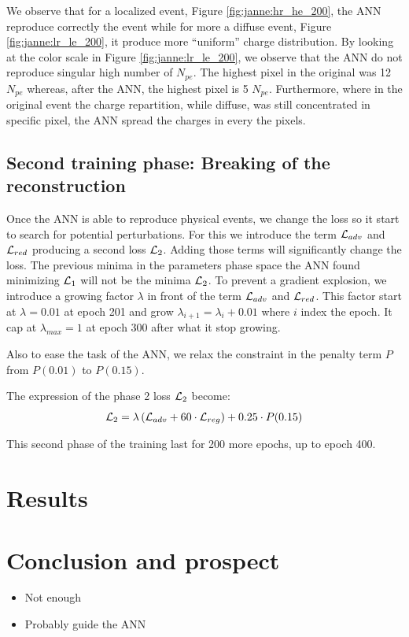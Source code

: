 \documentclass[../main.tex]{subfiles}
\begin{document}
We observe that for a localized event, Figure \ref{fig:janne:hr_he_200}, the ANN reproduce correctly the event while for more a diffuse event, Figure \ref{fig:janne:lr_le_200}, it produce more ``uniform'' charge distribution. By looking at the color scale in Figure \ref{fig:janne:lr_le_200}, we observe that the ANN do not reproduce singular high number of $N_{pe}$. The highest pixel in the original was 12 $N_{pe}$ whereas, after the ANN, the highest pixel is 5 $N_{pe}$. Furthermore, where in the original event the charge repartition, while diffuse, was still concentrated in specific pixel, the ANN spread the charges in every the pixels.

\subsection{Second training phase: Breaking of the reconstruction}
\label{sec:janne:results:break}

Once the ANN is able to reproduce physical events, we change the loss so it start to search for potential perturbations. For this we introduce the term ${\cal L}_{adv}$ and ${\cal L}_{red}$ producing a second loss ${\cal L}_2$. Adding those terms will significantly change the loss. The previous minima in the parameters phase space the ANN found minimizing ${\cal L}_1$ will not be the minima ${\cal L}_2$. To prevent a gradient explosion, we introduce a growing factor $\lambda$ in front of the term ${\cal L}_{adv}$ and ${\cal L}_{red}$. This factor start at $\lambda  = 0.01$ at epoch 201 and grow $\lambda_{i+1} = \lambda_{i} + 0.01$ where $i$ index the epoch. It cap at $\lambda_{max} = 1$ at epoch 300 after what it stop growing.

Also to ease the task of the ANN, we relax the constraint in the penalty term $P$ from $P(0.01)$ to $P(0.15)$.

The expression of the phase 2 loss ${\cal L}_2$ become:
\begin{equation}
  {\cal L}_2 = \lambda \left( {\cal L}_{adv} + 60 \cdot {\cal L}_{reg} \right) + 0.25 \cdot P(0.15)
\end{equation}

This second phase of the training last for 200 more epochs, up to epoch 400.


\section{Results}
\label{sec:janne:results}
\section{Conclusion and prospect}
\label{sec:janne:conclusion}
\begin{itemize}
  \item Not enough
  \item Probably guide the ANN
\end{itemize}
\end{document}
